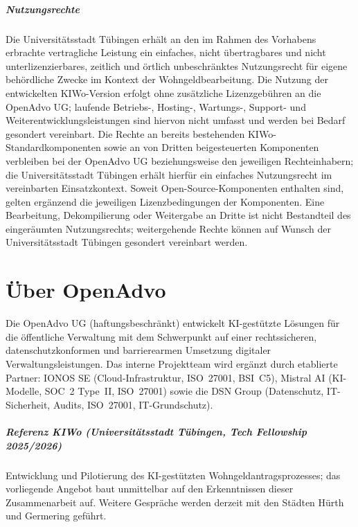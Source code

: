 \documentclass[11pt,a4paper,openany]{report}
\let\origparagraph\paragraph
\renewcommand{\paragraph}[1]{\needspace{4\baselineskip}\origparagraph{#1}}
\begin{document}
\paragraph{Nutzungsrechte}
Die Universitätsstadt Tübingen erhält an den im Rahmen des Vorhabens
erbrachte vertragliche Leistung ein einfaches, nicht übertragbares und nicht
unterlizenzierbares, zeitlich und örtlich unbeschränktes
Nutzungsrecht für eigene behördliche Zwecke im Kontext der
Wohngeldbearbeitung. Die Nutzung der entwickelten KIWo-Version erfolgt
ohne zusätzliche Lizenzgebühren an
die OpenAdvo UG; laufende Betriebs-, Hosting-, Wartungs-, Support- und
Weiterentwicklungsleistungen sind hiervon nicht umfasst und werden bei
Bedarf gesondert vereinbart. Die Rechte an bereits bestehenden
KIWo-Standardkomponenten sowie an von Dritten beigesteuerten Komponenten
verbleiben bei der OpenAdvo UG beziehungsweise den jeweiligen
Rechteinhabern; die Universitätsstadt Tübingen erhält hierfür ein
einfaches Nutzungsrecht im vereinbarten Einsatzkontext. Soweit
Open-Source-Komponenten enthalten sind, gelten ergänzend die jeweiligen
Lizenzbedingungen der Komponenten. Eine Bearbeitung, Dekompilierung oder
Weitergabe an Dritte ist nicht Bestandteil des eingeräumten
Nutzungsrechts; weitergehende Rechte können auf Wunsch der
Universitätsstadt Tübingen gesondert vereinbart werden.

\chapter{Über OpenAdvo}

Die OpenAdvo UG (haftungsbeschränkt) entwickelt KI-gestützte Lösungen
für die öffentliche Verwaltung mit dem Schwerpunkt auf einer
rechtssicheren, datenschutzkonformen und barrierearmen Umsetzung
digitaler Verwaltungsleistungen. Das interne Projektteam wird ergänzt
durch etablierte Partner: IONOS SE (Cloud-Infrastruktur, ISO~27001,
BSI~C5), Mistral AI (KI-Modelle, SOC~2 Type~II, ISO~27001) sowie die DSN
Group (Datenschutz, IT-Sicherheit, Audits, ISO~27001, IT-Grundschutz).

\paragraph{Referenz KIWo (Universitätsstadt Tübingen, Tech Fellowship 2025/2026)}
Entwicklung und Pilotierung des KI-gestützten Wohngeldantragsprozesses;
das vorliegende Angebot baut unmittelbar auf den Erkenntnissen dieser
Zusammenarbeit auf. Weitere Gespräche werden derzeit mit den Städten
Hürth und Germering geführt.
\end{document}
